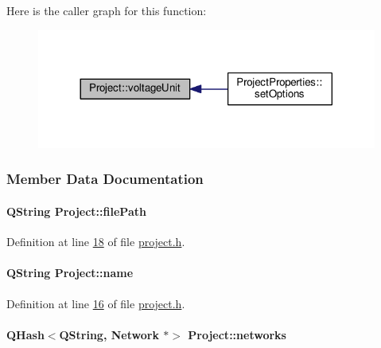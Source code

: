 Here is the caller graph for this function\+:
\nopagebreak
\begin{figure}[H]
\begin{center}
\leavevmode
\includegraphics[width=317pt]{class_project_a93b928093072ba15c24693b03a934e4e_icgraph}
\end{center}
\end{figure}




\subsubsection{Member Data Documentation}
\hypertarget{class_project_a79f30adcefd0b72bd4ac7db724bc9531}{}
\paragraph[{file\+Path}]{\setlength{\rightskip}{0pt plus 5cm}Q\+String Project\+::file\+Path}\label{class_project_a79f30adcefd0b72bd4ac7db724bc9531}


Definition at line \hyperlink{project_8h_source_l00018}{18} of file \hyperlink{project_8h_source}{project.\+h}.

\hypertarget{class_project_a82dd2d1bc38f9fd08c9a811fcaa76b38}{}
\paragraph[{name}]{\setlength{\rightskip}{0pt plus 5cm}Q\+String Project\+::name}\label{class_project_a82dd2d1bc38f9fd08c9a811fcaa76b38}


Definition at line \hyperlink{project_8h_source_l00016}{16} of file \hyperlink{project_8h_source}{project.\+h}.

\hypertarget{class_project_aa98126154cab59769a431668e6f17daf}{}
\paragraph[{networks}]{\setlength{\rightskip}{0pt plus 5cm}Q\+Hash$<$Q\+String, {\bf Network} $\ast$$>$ Project\+::networks}\label{class_project_aa98126154cab59769a431668e6f17daf}


